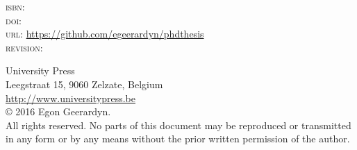 \thispagestyle{empty}
\begin{bottompar}

\textsc{isbn:} \\
\textsc{doi:} \\
\textsc{url:} \url{https://github.com/egeerardyn/phdthesis}\\
\textsc{revision:} \texttt{\VCRevision}

University Press\\
Leegstraat 15, 9060 Zelzate, Belgium\\
\url{http://www.universitypress.be}\\

\copyright{} 2016 Egon Geerardyn.\\

All rights reserved. No parts of this document may be reproduced or transmitted in any form or by any means without the prior written permission of the author.






\end{bottompar}
